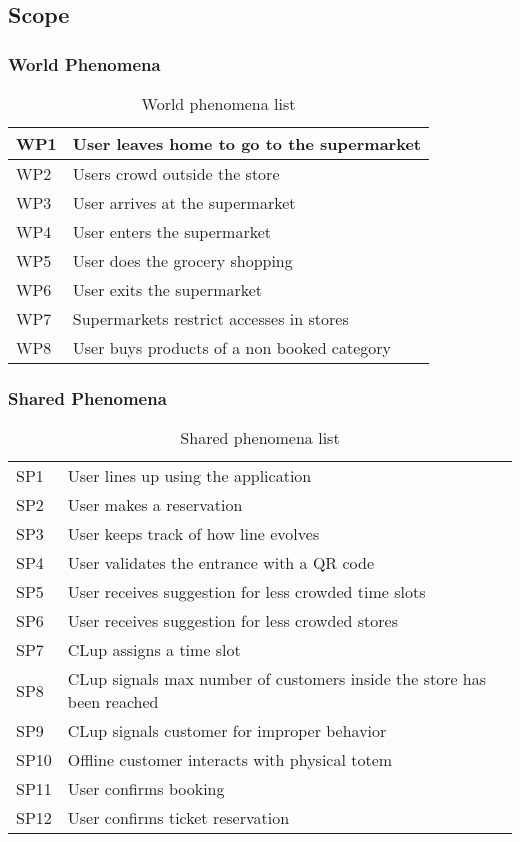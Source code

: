 \subsection{Scope}


\subsubsection{World Phenomena}

\begin{table}[H]
\begin{tabular}{l|l}
	WP1 & User leaves home to go to the supermarket\\\hline
	WP2 & Users crowd outside the store\\\hline
    WP3 & User arrives at the supermarket\\\hline
    WP4 & User enters the supermarket \\\hline
	WP5 & User does the grocery shopping \\\hline
	WP6 & User exits the supermarket\\\hline
	WP7 & Supermarkets restrict accesses in stores\\\hline %
	WP8 & User buys products of a non booked category\\\hline 
\end{tabular}
\caption{World phenomena list}
\label{tab:WorldPhen}
\end{table}

\subsubsection{Shared Phenomena}
\begin{table} [H]
\begin{tabular}{l|l}
	SP1 & User lines up using the application \\
	SP2 & User makes a reservation \\
	SP3 & User keeps track of how line evolves \\
	SP4 & User validates the entrance with a QR code \\
	SP5 & User receives suggestion for less crowded time slots \\
	SP6 & User receives suggestion for less crowded stores \\
	SP7 & CLup assigns a time slot \\
	SP8 & CLup signals max number of customers inside the store has been reached \\
	SP9 & CLup signals customer for improper behavior \\
	SP10 & Offline customer interacts with physical totem \\
	SP11 & User confirms booking \\
	SP12 & User confirms ticket reservation \\
	
\end{tabular}
\caption{Shared phenomena list}
\label{tab:SharedPhen}
\end{table}
